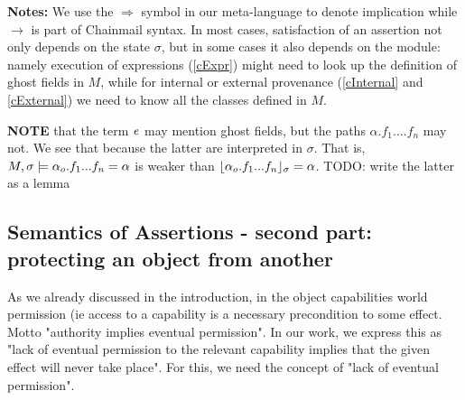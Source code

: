 \textbf{Notes:}  We use the $\Longrightarrow$ symbol in our meta-language to denote implication while $\rightarrow$ is part of Chainmail syntax.
In most cases, satisfaction of an assertion not only depends on the state $\sigma$, but 
in some cases it also depends on the module: namely execution of expressions (\ref{cExpr}) might need to look up the definition of ghost fields  in $M$, while 
for internal or external provenance (\ref{cInternal} and \ref{cExternal}) we need to know all the classes defined in $M$.

{\textbf{NOTE}  that the term $\mathit{e}$ may mention ghost fields, but the paths $\alpha.f_1....f_n$ may not. We see that because the latter are interpreted in $\sigma$. That is, $M , \sigma \models {\alpha_o.f_1...f_n}=\alpha$ is weaker than $\lfloor \alpha_{o}.f_1...f_n \rfloor_{\sigma}=\alpha$. TODO: write the latter as a lemma}


\subsection{Semantics of Assertions - second part:
protecting an object from another}

As we already discussed in the introduction, in the object capabilities world permission (ie access   to a capability is a necessary precondition to some effect. Motto "authority implies eventual permission".
In our work, we express this as "lack of eventual permission to the relevant capability implies that the given effect will never take place".
For this, we need the concept of "lack of  eventual permission".  



